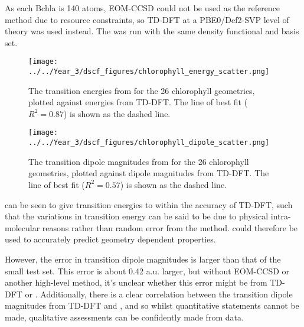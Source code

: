As each Bchla is 140 atoms, EOM-CCSD could not be used as the reference method due
to resource constraints, so TD-DFT at a PBE0/Def2-SVP level of theory was used instead.
The \dscf was run with the same density functional and basis set.

\begin{figure}
\centering
\texttt{[image: ../../Year\_3/dscf\_figures/chlorophyll\_energy\_scatter.png]}
\label{fig:chl_energy}
\caption{The transition energies from \dscf for the 26 chlorophyll geometries, 
plotted against energies from TD-DFT. The line of best fit ($R^2=0.87$) is shown 
as the dashed line.}
\end{figure}

\begin{figure}
\centering
\texttt{[image: ../../Year\_3/dscf\_figures/chlorophyll\_dipole\_scatter.png]}
\label{fig:chl_dipole}
\caption{The transition dipole magnitudes from \dscf for the 26 chlorophyll geometries, 
plotted against dipole magnitudes from TD-DFT. The line of best fit ($R^2= 0.57$) 
is shown as the dashed line.}
\end{figure}

\dscf can be seen to give transition energies to within the accuracy of TD-DFT, 
such that the variations in transition energy can be said to be due to
physical intra-molecular reasons rather than random error from the \dscf method.
\dscf could therefore be used to accurately predict geometry dependent properties.

However, the error in transition dipole magnitudes is larger than that of the small
test set. This error is about 0.42 a.u. larger, but without EOM-CCSD or another
high-level method, it's unclear whether this error might be from TD-DFT or \dscf.
Additionally, there is a clear correlation between the transition dipole magnitudes
from TD-DFT and \dscf, and so whilst quantitative statements cannot be made, qualitative
assessments can be confidently made from \dscf data.

\afterpartskip
